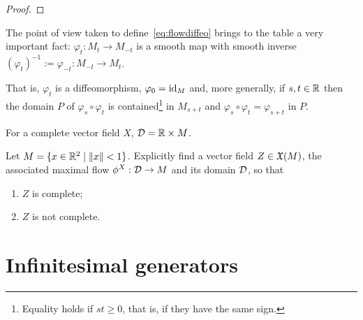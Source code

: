 \begin{proof}

\end{proof}

\begin{remark}\label{rmk:automorphismgroup}
  The point of view taken to define~\eqref{eq:flowdiffeo} brings to the table a very important fact: $\varphi_t : M_t \to M_{-t}$ is a smooth map with smooth inverse $(\varphi_t)^{-1}:=\varphi_{-t}: M_{-t} \to M_t$.

  That is, $\varphi_t$ is a diffeomorphism, $\varphi_0 = \operatorname{id}_M$ and, more generally, if $s,t \in \mathbb{R}$ then the domain $P$ of $\varphi_s \circ \varphi_t$ is contained\footnote{Equality holds if $st \geq 0$, that is, if they have the same sign.} in $M_{s+t}$ and $\varphi_s \circ \varphi_t = \varphi_{s+t}$ in $P$.
\end{remark}

For a complete vector field $X$, $\mathcal{D} = \mathbb{R}\times M$.

\begin{exercise}
  Let $M = \{x\in\mathbb{R}^2 \mid \|x\|<1\}$. Explicitly find a vector field $Z\in\mathfrak{X}(M)$, the associated maximal flow $\phi^X: \mathcal{D} \to M$ and its domain $\mathcal{D}$, so that
  \begin{enumerate}
    \item $Z$ is complete;
    \item $Z$ is not complete.
  \end{enumerate}
\end{exercise}

\section{Infinitesimal generators}

